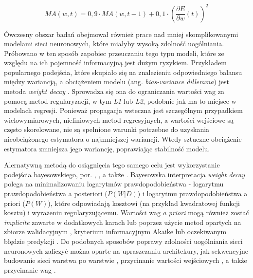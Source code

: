 \documentclass[12pt,a4paper,twoside]{article}
\begin{document}
\begin{equation} \label{eq:rmsprop_ma}
  {MA}(w,t) = 0,9 \cdot {MA}(w, t-1) + 0,1 \cdot (\frac{\partial E}{\partial w}(t))^2
\end{equation}

Ówczesny obszar badań obejmował również prace nad mniej skomplikowanymi modelami sieci neuronowych, które miałyby wysoką zdolność uogólniania. Próbowano w ten sposób zapobiec przeuczaniu tego typu modeli, które ze względu na ich pojemność informacyjną jest dużym ryzykiem. Przykładem popularnego podejścia, które skupiało się na znalezieniu odpowiedniego balansu między wariancją, a obciążeniem modelu (ang. \textit{bias-variance dillemma}) jest metoda \textit{weight decay} \citep{hanson1990}. Sprowadza się ona do ograniczania wartości wag za pomocą metod regularyzacji, w tym \textit{L1} lub \textit{L2}, podobnie jak ma to miejsce w modelach regresji. Ponieważ propagacja wsteczna jest szczególnym przypadkiem wielowymiarowych, nieliniowych metod regresyjnych, a wartości wejściowe są często skorelowane, nie są spełnione warunki potrzebne do uzyskania nieobciążonego estymatora o najmniejszej wariancji. Wtedy sztuczne obciążenie estymatora zmniejsza jego wariancję, poprawiając stabilność modelu.

Alernatywną metodą do osiągnięcia tego samego celu jest wykorzystanie podejścia bayesowskiego, por. \citet{nowlan1992}, \citet{hinton1993}, a także \citet{edwards1993}. Bayesowska interpretacja \textit{weight decay} polega na minimalizowaniu logarytmów prawdopodobieństwa - logarytmu prawdopodobieństwa a posteriori ($P(W|D)$) i logarytmu prawdopodobieństwa a priori ($P(W)$), które odpowiadają kosztowi (na przykład kwadratowej funkcji kosztu) i wyrażeniu regularyzującemu. Wartości wag \textit{a priori} mogą również zostać \textit{implicite} zawarte w dodatkowych karach \citep{mackay1992} lub poprzez użycie metod opartych na zbiorze walidacyjnym \citep{hastie1990}, kryterium informacyjnym Akaike \citep{akaike1974} lub oczekiwanym błędzie predykcji \citep{moody1994}. Do podobnych sposobów poprawy zdolności uogólniania sieci neuronowych zaliczyć można oparte na upraszczaniu architekury, jak sekwencyjne budowanie sieci warstwa po warstwie \citep{ivakhnenko1968}, przycinanie wartości wejściowych \citep{moody1991}, a także przycinanie wag \citep{lecun1989a}.
\end{document}
